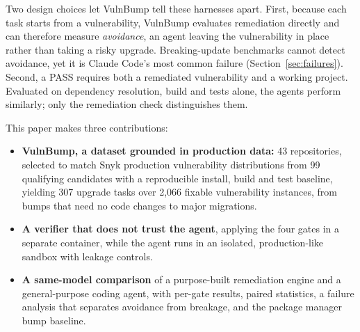\documentclass[11pt]{article}
\theoremstyle{definition}
\newcommand{\bench}{VulnBump}
\newcommand{\pmbump}{package manager bump}
\begin{document}
Two design choices let \bench{} tell these harnesses apart. First, because each task starts from a vulnerability, \bench{} evaluates remediation directly and can therefore measure \emph{avoidance}, an agent leaving the vulnerability in place rather than taking a risky upgrade. Breaking-update benchmarks cannot detect avoidance, yet it is Claude Code's most common failure (Section~\ref{sec:failures}). Second, a PASS requires both a remediated vulnerability and a working project. Evaluated on dependency resolution, build and tests alone, the agents perform similarly; only the remediation check distinguishes them.

This paper makes three contributions:
\begin{itemize}
  \item \textbf{\bench{}, a dataset grounded in production data:} 43 repositories, selected to match Snyk production vulnerability distributions from 99 qualifying candidates with a reproducible install, build and test baseline, yielding 307 upgrade tasks over 2{,}066 fixable vulnerability instances, from bumps that need no code changes to major migrations.
  \item \textbf{A verifier that does not trust the agent}, applying the four gates in a separate container, while the agent runs in an isolated, production-like sandbox with leakage controls.
  \item \textbf{A same-model comparison} of a purpose-built remediation engine and a general-purpose coding agent, with per-gate results, paired statistics, a failure analysis that separates avoidance from breakage, and the \pmbump{} baseline.
\end{itemize}
\end{document}
